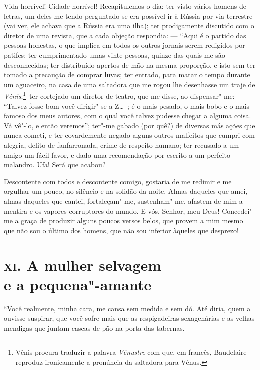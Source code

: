 Vida horrível! Cidade horrível! Recapitulemos o dia: ter visto vários
homens de letras, um deles me tendo perguntado se era possível
ir à Rússia por via terrestre (vai ver, ele achava que a Rússia era
uma ilha); ter prodigamente discutido com o diretor de uma revista,
que a cada objeção respondia: --- ``Aqui é o partido das
pessoas honestas, o que implica em todos os outros
jornais serem redigidos por patifes; ter cumprimentado umas vinte
pessoas, quinze das quais me são desconhecidas; ter distribuído
apertos de mão na mesma proporção, e isto sem ter tomado a precaução de
comprar luvas; ter entrado, para matar o tempo durante um aguaceiro,
na casa de uma saltadora que me rogou lhe desenhasse um traje de \textit{
Vênis};\footnote{  Vênis procura traduzir a palavra \textit{Vénustre} com que, em francês,
Baudelaire reproduz ironicamente a pronúncia da saltadora para Vênus.}~ter cortejado um diretor de teatro, que me
disse, ao dispensar"-me: --- “Talvez fosse bom você
dirigir"-se a Z\ldots\ ; é o mais pesado, o mais bobo e o mais famoso dos
meus autores, com o qual você talvez pudesse 
chegar a alguma coisa. Vá
vê"-lo, e então veremos''; ter"-me gabado (por
quê?) de diversas más ações que nunca cometi, e ter covardemente negado
alguns outros malfeitos que cumpri com alegria, delito de fanfarronada,
crime de respeito humano; ter recusado a um amigo um fácil favor, e
dado uma recomendação por escrito a um perfeito malandro. Ufa! Será que
acabou?

Descontente com todos e descontente comigo, gostaria de me redimir
e me orgulhar um pouco, no silêncio e na solidão da noite. Almas
daqueles que amei, almas daqueles que cantei, fortaleçam"-me,
sustenham"-me, afastem de mim a mentira e os vapores corruptores do
mundo. E vós, Senhor, meu Deus! Concedei"-me a graça de produzir alguns
poucos versos belos, que provem a mim mesmo que não sou o último dos
homens, que não sou inferior àqueles que desprezo!

\chapter[\textsc{xi.} A mulher selvagem e a pequena"-amante]{\textsc{xi.} A mulher selvagem\\ e a pequena"-amante}

“Você realmente, minha cara, me cansa sem medida e
sem dó. Até diria, quem a ouvisse suspirar, que você sofre mais que
as respigadeiras sexagenárias e as velhas mendigas que juntam cascas de
pão na porta das tabernas.

